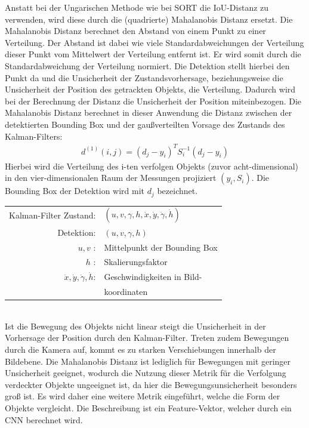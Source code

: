 \documentclass[conference]{IEEEtran}
\begin{document}
	Anstatt bei der Ungarischen Methode wie bei SORT die IoU-Distanz zu verwenden, wird diese durch die (quadrierte) Mahalanobis Distanz ersetzt. Die Mahalanobis Distanz berechnet den Abstand von einem Punkt zu einer Verteilung. Der Abstand ist dabei wie viele Standardabweichungen der Verteilung dieser Punkt vom Mittelwert der Verteilung entfernt ist. Er wird somit durch die Standardabweichung der Verteilung normiert. Die Detektion stellt hierbei den Punkt da und die Unsicherheit der Zustandsvorhersage, beziehungsweise die Unsicherheit der Position des getrackten Objekts, die Verteilung. Dadurch wird bei der Berechnung der Distanz die Unsicherheit der Position miteinbezogen. 
	Die Mahalanobis Distanz berechnet in dieser Anwendung die Distanz zwischen der detektierten Bounding Box und der gaußverteilten Vorsage des Zustands des Kalman-Filters:
	\begin{align}
		d^{(1)}(i,j)= (d_j - y_i)^TS^{-1}_i(d_j - y_i)
	\end{align}
	Hierbei wird die Verteilung des i-ten verfolgen Objekts (zuvor acht-dimensional) in den vier-dimensionalen Raum der Messungen projiziert $(y_i, S_i)$. Die Bounding Box der Detektion wird mit $d_j$ bezeichnet. \\
	
	
	\begin{tabular}{r l}
		Kalman-Filter Zustand: & $(u,v,\gamma,h,\dot{x},\dot{y},\dot{\gamma},\dot{h})$ \\
		Detektion: & $(u,v,\gamma,h)$ \\
		$u,v$ :& Mittelpunkt der Bounding Box \\
		$h$ :& Skalierungsfaktor \\
		$\dot{x},\dot{y},\dot{\gamma},\dot{h}$: & Geschwindigkeiten in Bild- \\	
		& koordinaten \\
	\end{tabular} \\
	
	Ist die Bewegung des Objekts nicht linear steigt die Unsicherheit in der Vorhersage der Position durch den Kalman-Filter. Treten zudem Bewegungen durch die Kamera auf, kommt es zu starken Verschiebungen innerhalb der Bildebene. Die Mahalanobis Distanz ist lediglich für Bewegungen mit geringer Unsicherheit geeignet, wodurch die Nutzung dieser Metrik für die Verfolgung verdeckter Objekte ungeeignet ist, da hier die Bewegungsunsicherheit besonders groß ist.
	Es wird daher eine weitere Metrik eingeführt, welche die Form der Objekte vergleicht. Die Beschreibung ist ein Feature-Vektor, welcher durch ein CNN berechnet wird. 
	
\end{document}
